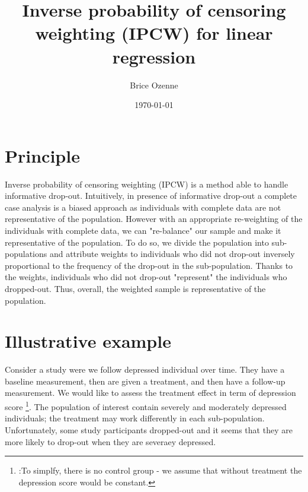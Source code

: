 \documentclass[12pt]{article}
\author{Brice Ozenne}
\date{\today}
\title{Inverse probability of censoring weighting (IPCW) for linear regression}
\begin{document}
\maketitle

\section{Principle}
\label{sec:org55b3c86}

Inverse probability of censoring weighting (IPCW) is a method able to
handle informative drop-out. Intuitively, in presence of informative
drop-out a complete case analysis is a biased approach as individuals
with complete data are not representative of the population. However
with an appropriate re-weighting of the individuals with complete
data, we can "re-balance" our sample and make it representative of the
population. To do so, we divide the population into sub-populations
and attribute weights to individuals who did not drop-out inversely
proportional to the frequency of the drop-out in the
sub-population. Thanks to the weights, individuals who did not
drop-out "represent" the individuals who dropped-out. Thus, overall,
the weighted sample is representative of the population.



\section{Illustrative example}
\label{sec:orgbd582b8}

Consider a study were we follow depressed individual over time. They
have a baseline measurement, then are given a treatment, and then have
a follow-up measurement. We would like to assess the treatment effect
in term of depression score \footnote{:To simplfy, there is no control
group - we assume that without treatment the depression score would be
constant.}. The population of interest contain severely and moderately
depressed individuals; the treatment may work differently in each
sub-population. Unfortunately, some study participants dropped-out and
it seems that they are more likely to drop-out when they are severaey
depressed.

\clearpage
\end{document}
